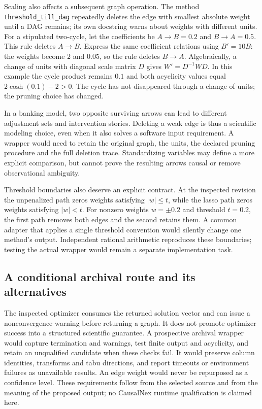Scaling also affects a subsequent graph operation. The method
\texttt{threshold\_till\_dag} repeatedly deletes the edge with smallest
absolute weight until a DAG remains; its own docstring warns about weights
with different units.\citep{exec14_causalnex_primary}
For a stipulated two-cycle, let the coefficients be $A\to B=0.2$ and
$B\to A=0.5$. This rule deletes $A\to B$. Express the same coefficient
relations using $B'=10B$: the weights become $2$ and $0.05$, so the rule
deletes $B\to A$. Algebraically, a change of units with diagonal scale matrix
$D$ gives $W'=D^{-1}WD$. In this example the cycle product remains $0.1$ and
both acyclicity values equal $2\cosh(0.1)-2>0$. The cycle has not disappeared
through a change of units; the pruning choice has changed.
\citep{exec14_causalnex_oracle}

In a banking model, two opposite surviving arrows can lead to different
adjustment sets and intervention stories. Deleting a weak edge is thus a
scientific modeling choice, even when it also solves a software input
requirement. A wrapper would need to retain the original graph, the units,
the declared pruning procedure and the full deletion trace. Standardizing
variables may define a more explicit comparison, but cannot prove the
resulting arrows causal or remove observational ambiguity.

Threshold boundaries also deserve an explicit contract. At the inspected
revision the unpenalized path zeros weights satisfying
$|w|\leq t$, while the lasso path zeros weights satisfying $|w|<t$.
For nonzero weights $w=\pm0.2$ and threshold $t=0.2$, the first path removes
both edges and the second retains them. A common adapter that applies a
single threshold convention would silently change one method's output.
Independent rational arithmetic reproduces these boundaries; testing the
actual wrapper would remain a separate implementation task.
\citep{exec14_causalnex_primary,exec14_causalnex_oracle}

\subsection{A conditional archival route and its alternatives}

The inspected optimizer consumes the returned solution vector and can issue a
nonconvergence warning before returning a graph. It does not promote optimizer
success into a structured scientific guarantee. A prospective archival
wrapper would capture termination and warnings, test finite output and
acyclicity, and retain an unqualified candidate when these checks fail. It
would preserve column identities, transforms and tabu directions, and report
timeouts or environment failures as unavailable results. An edge weight would
never be repurposed as a confidence level. These requirements follow from
the selected source and from the meaning of the proposed output; no CausalNex
runtime qualification is claimed here.\citep{exec14_causalnex_primary}

